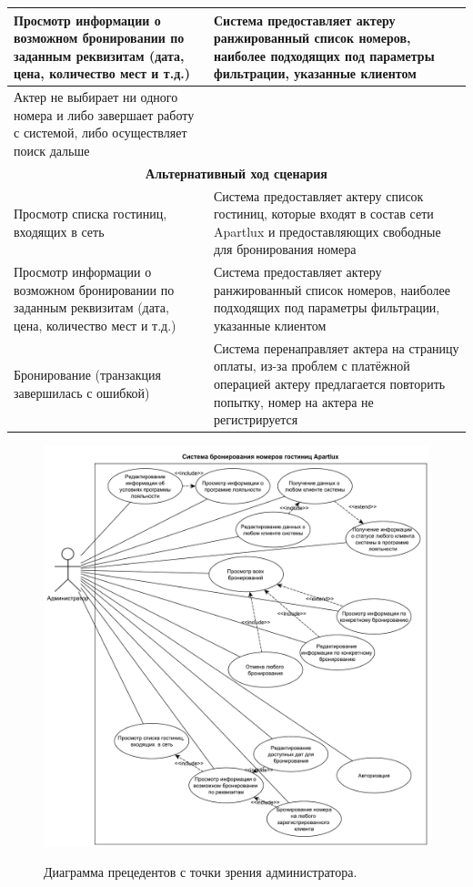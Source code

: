 \begin{longtable}{| p{6cm} | p{10cm} |}
	Просмотр информации о возможном бронировании по заданным реквизитам (дата, цена, количество мест и т.д.)
	&
	Система предоставляет актеру ранжированный список номеров, наиболее подходящих под параметры фильтрации, указанные клиентом \\
	\hline
	
	Актер не выбирает ни одного номера и либо завершает работу с системой, либо осуществляет поиск дальше
	&
	\\
	\hline
	
	\multicolumn{2}{|c|}{\textbf{Альтернативный ход сценария}} \\
	\hline
	
	Просмотр списка гостиниц, входящих в сеть
	&
	Система предоставляет актеру список гостиниц, которые входят в состав сети Apartlux и предоставляющих свободные для бронирования номера \\
	\hline
	
	Просмотр информации о возможном бронировании по заданным реквизитам (дата, цена, количество мест и т.д.)
	&
	Система предоставляет актеру ранжированный список номеров, наиболее подходящих под параметры фильтрации, указанные клиентом \\
	\hline
	
	Бронирование (транзакция завершилась с ошибкой)
	&
	Система перенаправляет актера на страницу оплаты, из-за проблем с платёжной операцией актеру предлагается повторить попытку, номер на актера не регистрируется
\end{longtable}

\begin{figure}[h!]
	\begin{center}
		{\includegraphics[scale = 0.54]{img/use-case/admin.pdf}}
		\caption{Диаграмма прецедентов с точки зрения администратора.}
		\label{fig:use-case-admin}
	\end{center}
\end{figure}

